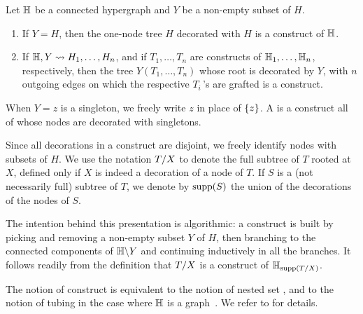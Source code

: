 \begin{definition} 
\label{inductive-construct}
Let ${\mathbb H}$ be a connected hypergraph and $Y$ be a non-empty subset of $H$.
\begin{enumerate}
\item  If $Y = H$, then the one-node tree $H$ decorated with $H$ is a construct of ${\mathbb H}$.
\item If ${\mathbb H},Y  \leadsto H_1,\ldots,H_n$, and if $T_1,\ldots,T_n$ are constructs of ${\mathbb H}_1,\ldots,{\mathbb H}_n$, respectively, then the
tree $Y(T_1,\ldots,T_n)$ whose root is decorated by $Y$, with $n$ outgoing edges on which the respective $T_i\,$'s are grafted is a construct.  
\end{enumerate}
When $Y={z}$ is a singleton, we freely write $z$ in place of $\left\{z\right\}$.
A  is a construct all of whose nodes are  decorated with singletons. 
\end{definition}

Since all decorations in a construct are disjoint, we freely identify nodes with subsets of $H$. 
We use the notation $T/X$ to denote the full subtree of $T$ rooted at $X$, defined only if $X$ is indeed a decoration of a node of $T$. 
If $S$ is a (not necessarily full) subtree of $T$, we denote by $\operatorname{supp}(S)$ the union of the decorations of the nodes of $S$.

\begin{rem} \label{subconstruct-restriction}
The intention behind this presentation is algorithmic: a construct is built by picking and removing a non-empty subset $Y$ of $H$, then branching to the connected components of ${\mathbb H}\backslash Y$ and continuing inductively in all the branches.
It follows readily from the definition that $T/X$ is a construct of ${\mathbb H}_{\operatorname{supp}(T/X)}$.
\end{rem}

\begin{rem}
    The notion of construct is equivalent to the notion of nested set \cite{P09}, and to the notion of tubing in the case where ${\mathbb H}$ is a graph~\cite{CD-CCGA}.  
    We refer to \cite[Sec.~3.1]{COI} for details.
\end{rem}


